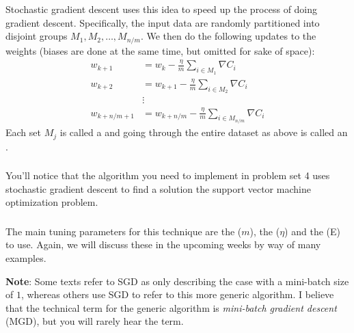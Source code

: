 \documentclass[xetex,mathserif,serif,aspectratio=169]{beamer}
\begin{document}
\begin{frame}[fragile] \frametitle{} \oldB \small


Stochastic gradient descent uses this idea to speed up the process of doing
gradient descent. Specifically, the input data are randomly partitioned into
disjoint groups $M_1, M_2, \ldots, M_{n/m}$. We then do the following updates to
the weights (biases are done at the same time, but omitted for sake of space):
\begin{align*}
w_{k+1} &= w_k - \frac{\eta}{m} \sum_{i \in M_1} \nabla C_i \\
w_{k+2} &= w_{k+1} - \frac{\eta}{m} \sum_{i \in M_2} \nabla C_i \\
&\vdots \\
w_{k+n/m+1} &= w_{k+n/m} - \frac{\eta}{m} \sum_{i \in M_{n/m}} \nabla C_i
\end{align*}
\pause Each set $M_j$ is called a  and going through the
entire dataset as above is called an .

\end{frame}


\begin{frame}[fragile] \frametitle{} \oldB \small


You'll notice that the algorithm you need to implement in problem set 4 uses
stochastic gradient descent to find a solution the support vector machine
optimization problem.

\end{frame}

\begin{frame}[fragile] \frametitle{} \oldB \small


The main tuning parameters for this technique are the  ($m$), the  ($\eta$) and the
 (E) to use. Again, we will discuss these in the
upcoming weeks by way of many examples.

\textbf{Note}: Some texts refer to SGD as only describing the case with a mini-batch
size of $1$, whereas others use SGD to refer to this more generic algorithm. I believe
that the technical term for the generic algorithm is \textit{mini-batch gradient descent} (MGD),
but you will rarely hear the term.

\end{frame}
\end{document}
